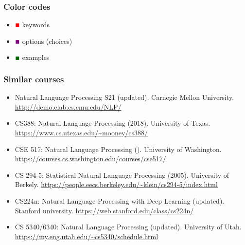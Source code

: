 \documentclass{beamer}
\begin{document}
\begin{frame}
	\frametitle{Color codes}
	
	\begin{itemize}
		\item {\Huge${\color{red}\blacksquare}$} keywords
		\item {\Huge${\color{violet}\blacksquare}$} options (choices)
		\item {\Huge${\color{olivegreen}\blacksquare}$} examples
	\end{itemize}
	
\end{frame}

\begin{frame}
	\frametitle{Similar courses}
	
	\begin{itemize}
		
		\item Natural Language Processing S21 (updated).
		Carnegie Mellon University. 
		\url{http://demo.clab.cs.cmu.edu/NLP/}
		
		\item CS388: Natural Language Processing (2018). 
		University of Texas. 
		\url{https://www.cs.utexas.edu/~mooney/cs388/}
		
		\item CSE 517: Natural Language Processing ().
		University of Washington.
		\url{https://courses.cs.washington.edu/courses/cse517/}
		
		\item CS 294-5: Statistical Natural Language Processing (2005). 
		University of Berkely. 
		\url{https://people.eecs.berkeley.edu/~klein/cs294-5/index.html}
		
		\item CS224n: Natural Language Processing with Deep Learning (updated).
		Stanford university.
		\url{https://web.stanford.edu/class/cs224n/}
		
		\item CS 5340/6340: Natural Language Processing (updated). 
		University of Utah.
		\url{https://my.eng.utah.edu/~cs5340/schedule.html}
		
	\end{itemize}
	
\end{frame}
\end{document}
